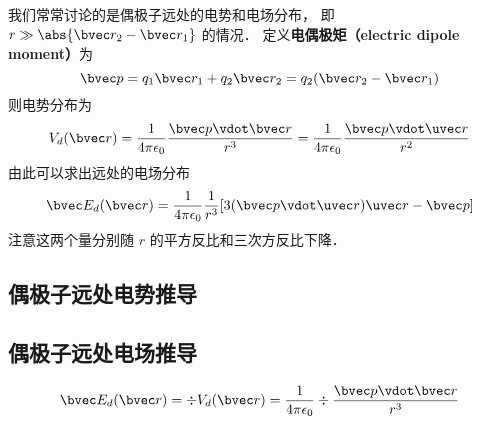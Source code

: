 我们常常讨论的是偶极子远处的电势和电场分布， 即 $r \gg \abs{\bvec r_2 - \bvec r_1}$ 的情况． 定义\textbf{电偶极矩（electric dipole moment）}为
\begin{equation}\label{eleDpl_eq1}
\bvec p = q_1 \bvec r_1 + q_2 \bvec r_2 = q_2 (\bvec r_2 - \bvec r_1)
\end{equation}
则电势分布为
\begin{equation}
V_d(\bvec r) = \frac{1}{4\pi\epsilon_0} \frac{\bvec p\vdot \bvec r}{r^3} = \frac{1}{4\pi\epsilon_0} \frac{\bvec p \vdot \uvec r}{r^2}
\end{equation}
由此可以求出远处的电场分布
\begin{equation}
\bvec E_d(\bvec r) = \frac{1}{4\pi\epsilon_0} \frac{1}{r^3} [3(\bvec p \vdot \uvec r) \uvec r - \bvec p]
\end{equation}
注意这两个量分别随 $r$ 的平方反比和三次方反比下降．

\subsection{偶极子远处电势推导}

\subsection{偶极子远处电场推导}

\begin{equation}
\bvec E_d(\bvec r) = \div V_d(\bvec r) = \frac{1}{4\pi\epsilon_0} \div  \frac{\bvec p\vdot \bvec r}{r^3}
\end{equation}
